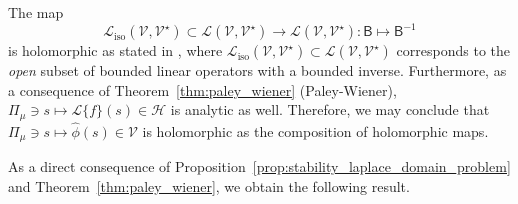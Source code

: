 The map
\begin{equation}
    \mathscr{L}_{\text{iso}}(\mathcal{V},\mathcal{V}^\star) 
    \subset\mathscr{L}(\mathcal{V},\mathcal{V}^\star)\rightarrow \mathscr{L}(\mathcal{V},\mathcal{V}^\star): \mathsf{B} \mapsto \mathsf{B}^{-1}
\end{equation}
is holomorphic as stated in \cite[Proposition 4.20]{henriquez2021shape}, where $\mathscr{L}_{\text{iso}}(\mathcal{V},\mathcal{V}^\star) \subset \mathscr{L}(\mathcal{V},\mathcal{V}^\star)$ corresponds to the {\it open} subset of bounded linear operators with a bounded inverse. 
Furthermore, as a consequence of Theorem~\ref{thm:paley_wiener} (Paley-Wiener), 
$\Pi_\mu \ni s \mapsto \mathcal{L}\{f\}(s) \in \mathcal{H}$ is analytic as well. Therefore, we may conclude that 
$\Pi_\mu \ni s \mapsto \widehat{\phi}(s) \in \mathcal{V}$ is holomorphic as the composition of holomorphic maps. 

As a direct consequence of Proposition~\ref{prop:stability_laplace_domain_problem} and Theorem~\ref{thm:paley_wiener}, we obtain the following result. 

